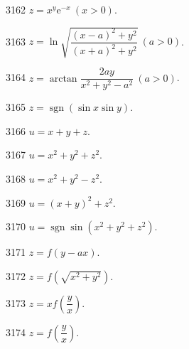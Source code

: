 \begin{prob}[S]{3162}
$z = x^y \mathrm{e}^{-x} \ (x > 0)$.
\end{prob}

\begin{prob}[S]{3163}
$z = \ln\sqrt{\dfrac{(x - a)^2 + y^2}{(x + a)^2 + y^2}} \ (a > 0)$.
\end{prob}

\begin{prob}[S]{3164}
$z = \arctan \dfrac{2ay}{x^2 + y^2 - a^2} \ (a > 0)$.
\end{prob}

\begin{prob}[S]{3165}
$z = \operatorname{sgn}(\sin x \sin y)$.
\end{prob}


\begin{prob}[S]{3166}
$u = x + y + z$.
\end{prob}

\begin{prob}[S]{3167}
$u = x^2 + y^2 + z^2$.
\end{prob}

\begin{prob}[S]{3168}
$u = x^2 + y^2 - z^2$.
\end{prob}

\begin{prob}[S]{3169}
$u = (x + y)^2 + z^2$.
\end{prob}

\begin{prob}[S]{3170}
$u = \operatorname{sgn}\sin(x^2 + y^2 + z^2)$.
\end{prob}


\begin{prob}[S]{3171}
$z = f(y - ax)$.
\end{prob}

\begin{prob}[S]{3172}
$z = f(\sqrt{x^2 + y^2})$.
\end{prob}

\begin{prob}[S]{3173}
$z = xf\left(\dfrac{y}{x}\right)$.
\end{prob}

\begin{prob}[S]{3174}
$z = f\left(\dfrac{y}{x}\right)$.
\end{prob}

